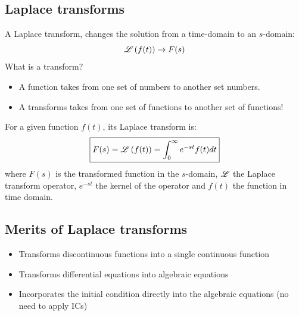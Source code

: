 \subsection{Laplace transforms}

A Laplace transform, changes the solution from a time-domain to an $s$-domain:
\begin{equation*}
\operatorname{\mathscr{L}}\left(f(t) \right) \rightarrow F(s)
\end{equation*}
What is a transform?
\begin{itemize}
\item A function takes from one set of numbers to another set numbers.
\item A transforms takes from one set of functions to another set of functions!
\end{itemize}

For a given function $f(t)$, its Laplace transform is:
\begin{equation}
\boxed{F(s)=\operatorname{\mathscr{L}}\left( f(t) \right) =\int^\infty_0 e^{-st} f(t) dt}
\end{equation}
where $F(s)$ is the transformed function in the $s$-domain, $\operatorname{\mathscr{L}}$ the Laplace transform operator, $e^{-st}$ the kernel of the operator and $f(t)$ the function in time domain.



\subsection*{Merits of Laplace transforms}
\begin{itemize}
\item Transforms discontinuous functions into a single continuous function
\item Transforms differential equations into algebraic equations
\item Incorporates the initial condition directly into the algebraic equations (no need to apply ICs)
\end{itemize}





